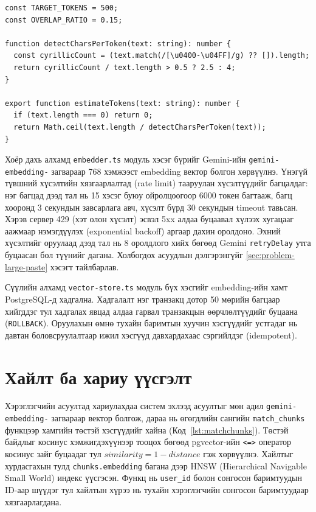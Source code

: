 \documentclass[../main.tex]{subfiles}
\begin{document}
\begin{lstlisting}[caption={Кирилл тэмдэгтийн эзлэх хувиар токены тоог ойролцоолох нь (chunker.ts)}, label={lst:chunker}]
const TARGET_TOKENS = 500;
const OVERLAP_RATIO = 0.15;

function detectCharsPerToken(text: string): number {
  const cyrillicCount = (text.match(/[\u0400-\u04FF]/g) ?? []).length;
  return cyrillicCount / text.length > 0.5 ? 2.5 : 4;
}

export function estimateTokens(text: string): number {
  if (text.length === 0) return 0;
  return Math.ceil(text.length / detectCharsPerToken(text));
}
\end{lstlisting}

Хоёр дахь алхамд \texttt{embedder.ts} модуль хэсэг бүрийг Gemini-ийн
\texttt{gemini-\allowbreak embedding-} загвараар 768 хэмжээст embedding вектор болгон
хөрвүүлнэ. Үнэгүй түвшний хүсэлтийн хязгаарлалтад (rate limit) тааруулан
хүсэлтүүдийг багцалдаг: нэг багцад дээд тал нь 15 хэсэг буюу ойролцоогоор 6000
токен багтааж, багц хооронд 3 секундын завсарлага авч, хүсэлт бүрд 30 секундын
timeout тавьсан. Хэрэв сервер 429 (хэт олон хүсэлт) эсвэл 5xx алдаа буцаавал
хүлээх хугацааг аажмаар нэмэгдүүлэх (exponential backoff) аргаар дахин оролдоно.
Эхний хүсэлтийг оруулаад дээд тал нь 8 оролдлого хийх бөгөөд Gemini
\texttt{retryDelay} утга буцаасан бол түүнийг дагана. Холбогдох асуудлын
дэлгэрэнгүйг \ref{sec:problem-large-paste} хэсэгт тайлбарлав.

Сүүлийн алхамд \texttt{vector-store.ts} модуль бүх хэсгийг embedding-ийн хамт
PostgreSQL-д хадгална. Хадгалалт нэг транзакц дотор 50 мөрийн багцаар хийгддэг
тул хадгалах явцад алдаа гарвал транзакцын өөрчлөлтүүдийг буцаана
(\texttt{ROLLBACK}). Оруулахын өмнө тухайн баримтын хуучин хэсгүүдийг
устгадаг нь давтан боловсруулалтаар ижил хэсгүүд давхардахаас сэргийлдэг
(idempotent).

\section{Хайлт ба хариу үүсгэлт}

Хэрэглэгчийн асуултад хариулахдаа систем эхлээд асуултыг мөн адил
\texttt{gemini-\allowbreak embedding-} загвараар вектор болгож, дараа нь өгөгдлийн сангийн
\texttt{match\_chunks} функцээр хамгийн төстэй хэсгүүдийг хайна
(Код~\ref{lst:matchchunks}). Төстэй байдлыг косинус хэмжигдэхүүнээр тооцох
бөгөөд pgvector-ийн \texttt{<=>} оператор косинус зайг буцаадаг тул
$similarity = 1 - distance$ гэж хөрвүүлнэ. Хайлтыг хурдасгахын тулд
\texttt{chunks.embedding} багана дээр HNSW (Hierarchical Navigable Small World)
индекс үүсгэсэн. Функц нь \texttt{user\_id} болон сонгосон баримтуудын ID-аар
шүүдэг тул хайлтын хүрээ нь тухайн хэрэглэгчийн сонгосон баримтуудаар
хязгаарлагдана.
\end{document}
